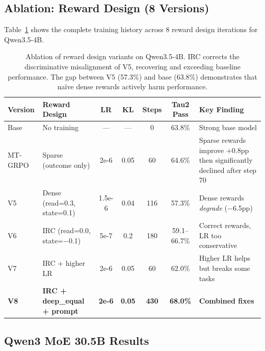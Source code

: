 \documentclass[11pt]{article}
\newcommand{\irc}{\textsc{IRC}}
\begin{document}
\subsection{Ablation: Reward Design (8 Versions)}

Table~\ref{tab:ablation} shows the complete training history across 8 reward design iterations for Qwen3.5-4B.

\begin{table}[t]
\centering
\small
\begin{tabular}{llccccp{5cm}}
\toprule
\textbf{Version} & \textbf{Reward Design} & \textbf{LR} & \textbf{KL} & \textbf{Steps} & \textbf{Tau2 Pass} & \textbf{Key Finding} \\
\midrule
Base & No training & --- & --- & 0 & 63.8\% & Strong base model \\
MT-GRPO & Sparse (outcome only) & 2e-6 & 0.05 & 60 & 64.6\% & Sparse rewards improve +0.8pp then significantly declined after step 70 \\
V5 & Dense (read=0.3, state=0.1) & 1.5e-6 & 0.04 & 116 & 57.3\% & Dense rewards \emph{degrade} ($-$6.5pp) \\
V6 & \irc{} (read=0.0, state=$-$0.1) & 5e-7 & 0.2 & 180 & 59.1--66.7\% & Correct rewards, LR too conservative \\
V7 & \irc{} + higher LR & 2e-6 & 0.05 & 60 & 62.0\% & Higher LR helps but breaks some tasks \\
\textbf{V8} & \textbf{ \irc{} + deep\_equal + prompt} & \textbf{2e-6} & \textbf{0.05} & \textbf{430} & \textbf{68.0\%} & \textbf{Combined fixes} \\
\bottomrule
\end{tabular}
\caption{Ablation of reward design variants on Qwen3.5-4B. \irc{} corrects the discriminative misalignment of V5, recovering and exceeding baseline performance. The gap between V5 (57.3\%) and base (63.8\%) demonstrates that na\"ive dense rewards actively harm performance.}
\label{tab:ablation}
\end{table}

\subsection{Qwen3 MoE 30.5B Results}
\end{document}

